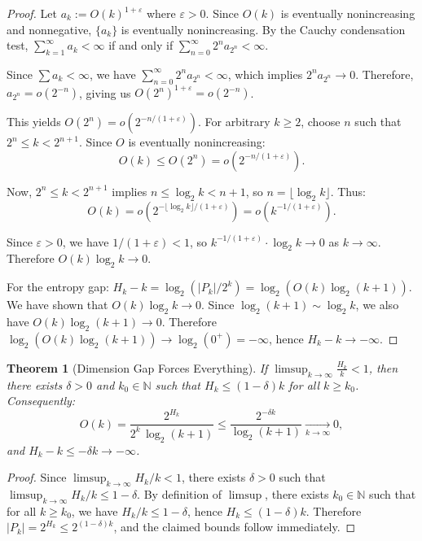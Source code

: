 \documentclass[11pt]{article}
\newtheorem{theorem}{Theorem}
\theoremstyle{definition}
\newcommand{\bbN}{\mathbb{N}}
\newcommand{\eps}{\varepsilon}
\begin{document}
\begin{proof}
Let $a_k:=O(k)^{1+\eps}$ where $\eps > 0$. Since $O(k)$ is eventually nonincreasing and nonnegative, $\{a_k\}$ is eventually nonincreasing. By the Cauchy condensation test, $\sum_{k=1}^\infty a_k < \infty$ if and only if $\sum_{n=0}^\infty 2^n a_{2^n} < \infty$.

Since $\sum a_k < \infty$, we have $\sum_{n=0}^\infty 2^n a_{2^n} < \infty$, which implies $2^n a_{2^n} \to 0$. Therefore, $a_{2^n} = o(2^{-n})$, giving us $O(2^n)^{1+\eps} = o(2^{-n})$.

This yields $O(2^n) = o(2^{-n/(1+\eps)})$. For arbitrary $k \geq 2$, choose $n$ such that $2^n \leq k < 2^{n+1}$. Since $O$ is eventually nonincreasing:
$$O(k) \leq O(2^n) = o(2^{-n/(1+\eps)}).$$

Now, $2^n \leq k < 2^{n+1}$ implies $n \leq \log_2 k < n+1$, so $n = \lfloor \log_2 k \rfloor$. Thus:
$$O(k) = o\left(2^{-\lfloor \log_2 k \rfloor/(1+\eps)}\right) = o\left(k^{-1/(1+\eps)}\right).$$

Since $\eps > 0$, we have $1/(1+\eps) < 1$, so $k^{-1/(1+\eps)} \cdot \log_2 k \to 0$ as $k \to \infty$. Therefore $O(k)\log_2 k \to 0$.

For the entropy gap: $H_k - k = \log_2(|P_k|/2^k) = \log_2(O(k)\log_2(k+1))$. We have shown that $O(k)\log_2 k \to 0$. Since $\log_2(k+1) \sim \log_2 k$, we also have $O(k)\log_2(k+1) \to 0$. Therefore $\log_2(O(k)\log_2(k+1)) \to \log_2(0^+) = -\infty$, hence $H_k - k \to -\infty$.
\end{proof}

\begin{theorem}[Dimension Gap Forces Everything]\label{thm:dimension-gap}
If $\displaystyle \limsup_{k\to\infty}\frac{H_k}{k}<1$, then there exists $\delta>0$ and $k_0 \in \bbN$ such that $H_k\le (1-\delta)k$ for all $k\ge k_0$. Consequently:
\begin{equation}
O(k)=\frac{2^{H_k}}{2^k\,\log_2(k+1)}\le\frac{2^{-\delta k}}{\log_2(k+1)}\xrightarrow[k\to\infty]{}0,
\end{equation}
and $H_k-k\le -\delta k\to -\infty$.
\end{theorem}

\begin{proof}
Since $\limsup_{k\to\infty} H_k/k < 1$, there exists $\delta > 0$ such that $\limsup_{k\to\infty} H_k/k \le 1-\delta$. By definition of $\limsup$, there exists $k_0 \in \bbN$ such that for all $k \ge k_0$, we have $H_k/k \le 1-\delta$, hence $H_k \le (1-\delta)k$. Therefore $|P_k|=2^{H_k}\le 2^{(1-\delta)k}$, and the claimed bounds follow immediately.
\end{proof}
\end{document}
